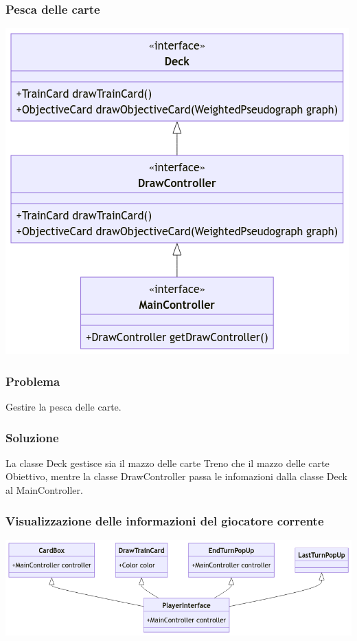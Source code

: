 \documentclass[a4paper,12pt]{report}
\begin{document}
\subsubsection{Pesca delle carte}
\begin{center}
\includegraphics[scale=0.6]{drawControllerUML.png}
\end{center}
%
\subsubsection{Problema}  
Gestire la pesca delle carte.
%
\subsubsection{Soluzione} 
La classe Deck gestisce sia il mazzo delle carte Treno che il mazzo delle carte Obiettivo, mentre la classe DrawController passa le infomazioni dalla classe Deck al MainController.
\newpage
\subsubsection{Visualizzazione delle informazioni del giocatore corrente}
\begin{center}
\includegraphics[scale=0.5]{viewUML.png}
\end{center}
%
\end{document}
